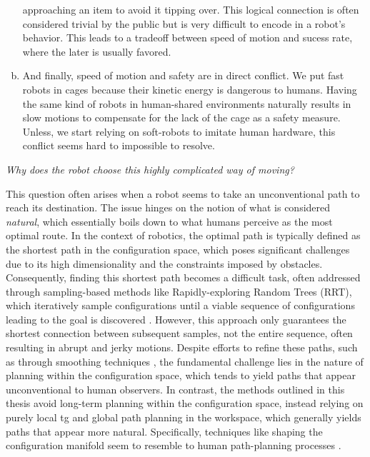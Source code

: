 \begin{enumerate}[(a)]
    approaching an item to avoid it tipping over. This
    logical connection is often considered trivial by the
    public but is very difficult to encode in a robot's
    behavior. This leads to a tradeoff between speed of
    motion and sucess rate, where the later is usually
    favored.
  \item And finally, speed of motion and safety are in direct
    conflict. We put fast robots in cages because their
    kinetic energy is dangerous to humans. Having the same
    kind of robots in human-shared environments naturally 
    results in slow motions to compensate for the lack of
    the cage as a safety measure. Unless, we start relying
    on soft-robots to imitate human hardware, this conflict
    seems hard to impossible to resolve.
\end{enumerate}

\textit{Why does the robot choose this highly complicated
way of moving?}

This question often arises when a robot seems to take an
unconventional path to reach its destination. The issue
hinges on the notion of what is considered \textit{natural},
which essentially boils down to what humans perceive as the
most optimal route. In the context of robotics, the optimal
path is typically defined as the shortest path in the
configuration space, which poses significant challenges due
to its high dimensionality and the constraints imposed by
obstacles. Consequently, finding this shortest path becomes
a difficult task, often addressed through sampling-based
methods like Rapidly-exploring Random Trees (RRT), which
iteratively sample configurations until a viable sequence of
configurations leading to the goal is discovered
\cite{Karaman2011}. However, this approach only guarantees
the shortest connection between subsequent samples, not the
entire sequence, often resulting in abrupt and jerky
motions. Despite efforts to refine these paths, such as
through smoothing techniques
\cite{siegwart2011introduction}, the fundamental challenge
lies in the nature of planning within the configuration
space, which tends to yield paths that appear unconventional
to human observers. In contrast, the methods outlined in
this thesis avoid long-term planning within the
configuration space, instead relying on purely local \ac{tg}
and global path planning in the workspace, which generally
yields paths that appear more natural. Specifically,
techniques like shaping the configuration manifold seem to
resemble to human path-planning processes
\cite{klein2022riemannian}.

